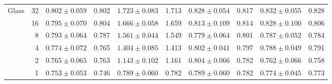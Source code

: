 \begin{table}[t]
\begin{tabular}{lrcrcrcrcr}
\midrule
Glass & 32 & $0.802 \pm 0.059$ & 0.802 & $1.723 \pm 0.083$ & 1.713 & $0.828 \pm 0.054$ & 0.817 & $0.832 \pm 0.055$ & 0.828 \\
 & 16 & $0.795 \pm 0.070$ & 0.804 & $1.666 \pm 0.058$ & 1.659 & $0.813 \pm 0.109$ & 0.814 & $0.828 \pm 0.100$ & 0.806 \\
 & 8 & $0.793 \pm 0.064$ & 0.787 & $1.561 \pm 0.044$ & 1.549 & $0.779 \pm 0.064$ & 0.801 & $0.787 \pm 0.052$ & 0.784 \\
 & 4 & $0.774 \pm 0.072$ & 0.765 & $1.404 \pm 0.085$ & 1.413 & $0.802 \pm 0.041$ & 0.797 & $0.788 \pm 0.049$ & 0.791 \\
 & 2 & $0.765 \pm 0.065$ & 0.763 & $1.143 \pm 0.102$ & 1.161 & $0.804 \pm 0.066$ & 0.782 & $0.762 \pm 0.066$ & 0.758 \\
 & 1 & $0.753 \pm 0.053$ & 0.746 & $0.789 \pm 0.060$ & 0.782 & $0.789 \pm 0.060$ & 0.782 & $0.774 \pm 0.045$ & 0.773 \\
\bottomrule
\end{tabular}
\end{table}
